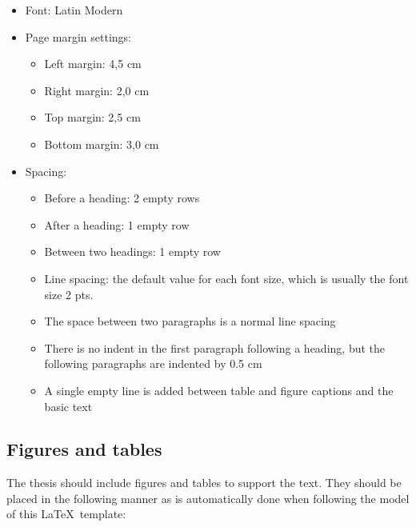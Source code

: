 \begin{itemize}
    \setlength\itemsep{0pt}
    \setlength\parskip{0pt}
  \item Font: Latin Modern
  \item Page margin settings:
    \begin{itemize}[wide=0pt]
        \setlength\itemsep{0pt}
        \setlength\parskip{0pt}
      \item Left margin: 4,5 cm
      \item Right margin: 2,0 cm
      \item Top margin: 2,5 cm
      \item Bottom margin: 3,0 cm
    \end{itemize}
  \item Spacing:
    \begin{itemize}[wide=0pt]
        \setlength\itemsep{0pt}
        \setlength\parskip{0pt}
      \item Before a heading: 2 empty rows
      \item After a heading: 1 empty row
      \item Between two headings: 1 empty row
      \item Line spacing: the default value for each font size, which
        is usually the font size 2 pts.
      \item The space between two paragraphs is a normal line spacing
      \item There is no indent in the first paragraph following a
        heading, but the following
        paragraphs are indented by 0.5 cm
      \item A single empty line is added between table and figure
        captions and the basic text
    \end{itemize}
\end{itemize}

\subsection{Figures and tables}
The thesis should include figures and tables to support the text.
They should be placed in the following manner as is automatically
done when following the model of this \LaTeX\ template:

